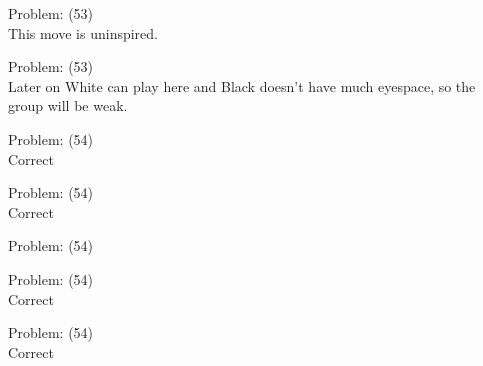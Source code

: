 \documentclass[11pt]{article}
\begin{document}
\begin{minipage}[t]{0.5\textwidth}
  {\centering
  
Problem: (53)\\
This move is uninspired.\\
  }
\end{minipage}
\begin{minipage}[t]{0.5\textwidth}
  {\centering
  
Problem: (53)\\
Later on White can play here and Black doesn't have much eyespace, so the group will be weak.\\
  }
\end{minipage}
\begin{minipage}[t]{0.5\textwidth}
  {\centering
  
Problem: (54)\\
Correct\\
  }
\end{minipage}
\begin{minipage}[t]{0.5\textwidth}
  {\centering
  
Problem: (54)\\
Correct\\
  }
\end{minipage}
\begin{minipage}[t]{0.5\textwidth}
  {\centering
  
Problem: (54)\\
  }
\end{minipage}
\begin{minipage}[t]{0.5\textwidth}
  {\centering
  
Problem: (54)\\
Correct\\
  }
\end{minipage}
\begin{minipage}[t]{0.5\textwidth}
  {\centering
  
Problem: (54)\\
Correct\\
  }
\end{minipage}
\end{document}
